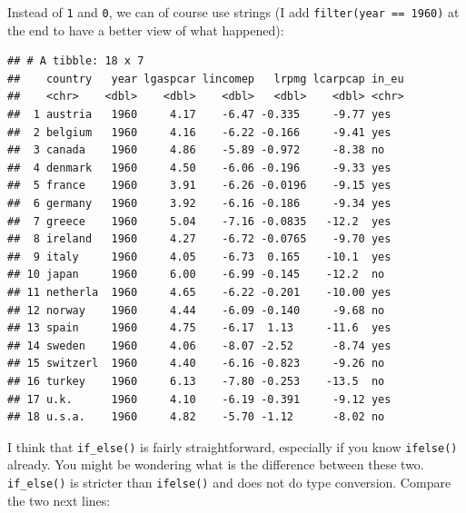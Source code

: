 \documentclass[]{gitbook}
\newenvironment{Shaded}{\begin{snugshade}}{\end{snugshade}}
\newcommand{\DataTypeTok}[1]{\textcolor[rgb]{0.13,0.29,0.53}{#1}}
\newcommand{\DecValTok}[1]{\textcolor[rgb]{0.00,0.00,0.81}{#1}}
\newcommand{\KeywordTok}[1]{\textcolor[rgb]{0.13,0.29,0.53}{\textbf{#1}}}
\newcommand{\NormalTok}[1]{#1}
\newcommand{\OperatorTok}[1]{\textcolor[rgb]{0.81,0.36,0.00}{\textbf{#1}}}
\newcommand{\StringTok}[1]{\textcolor[rgb]{0.31,0.60,0.02}{#1}}
\begin{document}
Instead of \texttt{1} and \texttt{0}, we can of course use strings (I add \texttt{filter(year\ ==\ 1960)} at the end to
have a better view of what happened):

\begin{Shaded}
\end{Shaded}

\begin{verbatim}
## # A tibble: 18 x 7
##    country   year lgaspcar lincomep   lrpmg lcarpcap in_eu
##    <chr>    <dbl>    <dbl>    <dbl>   <dbl>    <dbl> <chr>
##  1 austria   1960     4.17    -6.47 -0.335     -9.77 yes  
##  2 belgium   1960     4.16    -6.22 -0.166     -9.41 yes  
##  3 canada    1960     4.86    -5.89 -0.972     -8.38 no   
##  4 denmark   1960     4.50    -6.06 -0.196     -9.33 yes  
##  5 france    1960     3.91    -6.26 -0.0196    -9.15 yes  
##  6 germany   1960     3.92    -6.16 -0.186     -9.34 yes  
##  7 greece    1960     5.04    -7.16 -0.0835   -12.2  yes  
##  8 ireland   1960     4.27    -6.72 -0.0765    -9.70 yes  
##  9 italy     1960     4.05    -6.73  0.165    -10.1  yes  
## 10 japan     1960     6.00    -6.99 -0.145    -12.2  no   
## 11 netherla  1960     4.65    -6.22 -0.201    -10.00 yes  
## 12 norway    1960     4.44    -6.09 -0.140     -9.68 no   
## 13 spain     1960     4.75    -6.17  1.13     -11.6  yes  
## 14 sweden    1960     4.06    -8.07 -2.52      -8.74 yes  
## 15 switzerl  1960     4.40    -6.16 -0.823     -9.26 no   
## 16 turkey    1960     6.13    -7.80 -0.253    -13.5  no   
## 17 u.k.      1960     4.10    -6.19 -0.391     -9.12 yes  
## 18 u.s.a.    1960     4.82    -5.70 -1.12      -8.02 no
\end{verbatim}

I think that \texttt{if\_else()} is fairly straightforward, especially if you know \texttt{ifelse()} already. You
might be wondering what is the difference between these two. \texttt{if\_else()} is stricter than
\texttt{ifelse()} and does not do type conversion. Compare the two next lines:
\end{document}
